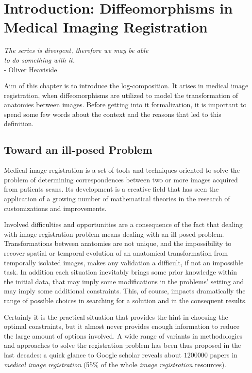 \chapter{Introduction: Diffeomorphisms in Medical Imaging Registration}\label{ch:introduction}


\begin{flushright}
		\emph{The series is divergent, therefore we may be able \\ to do something with it.}\\
			- Oliver Heaviside
\end{flushright}

\vspace{0.6cm}


Aim of this chapter is to introduce the log-composition. It arises in medical image registration, when diffeomorphisms are utilized to model the transformation of anatomies between images. Before getting into it formalization, it is important to spend some few words about the context and the reasons that led to this definition. 

\section{Toward an ill-posed Problem}
Medical image registration is a set of tools and techniques oriented to solve the problem of determining correspondences between two or more images acquired from patients scans. Its development is a creative field that has seen the application of a growing number of mathematical theories in the research of customizations and improvements.

Involved difficulties and opportunities are a consequence of the fact that dealing with image registration problem means dealing with an ill-posed problem. Transformations between anatomies are not unique, and the impossibility to recover spatial or temporal evolution of an anatomical transformation from temporally isolated images, makes any validation a difficult, if not an impossible task. 
In addition each situation inevitably brings some prior knowledge within the initial data, that may imply some modifications in the problems' setting and may imply some additional constraints. This, of course, impacts dramatically the range of possible choices in searching for a solution and in the consequent results. 

Certainly it is the practical situation that provides the hint in choosing the optimal constraints, but it almost never provides enough information to reduce the large amount of options involved. A wide range of variants in methodologies and approaches to solve the registration problem has been thus proposed in the last decades: a quick glance to Google scholar reveals about $1200000$ papers in \emph{medical image registration} (55\% of the whole \emph{image registration} resources). 

